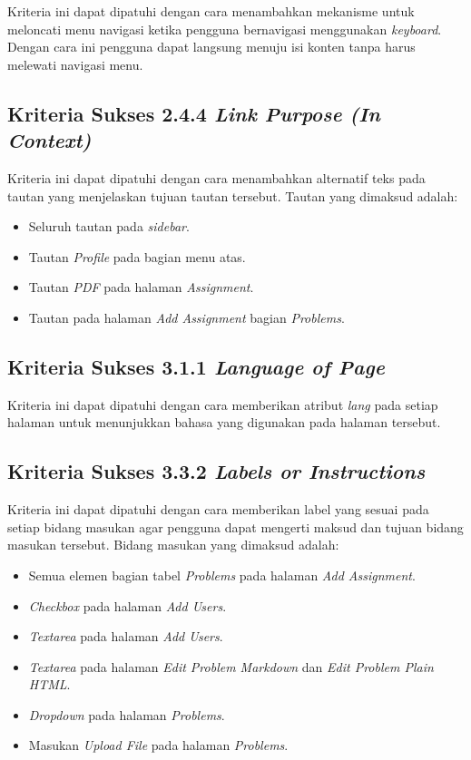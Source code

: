 Kriteria ini dapat dipatuhi dengan cara menambahkan mekanisme untuk meloncati menu navigasi ketika pengguna bernavigasi menggunakan \textit{keyboard}. Dengan cara ini pengguna dapat langsung menuju isi konten tanpa harus melewati navigasi menu.

\subsection{Kriteria Sukses 2.4.4 \textit{Link Purpose (In Context)}}
\label{subsec:peningkatan_A_2.4.4}

Kriteria ini dapat dipatuhi dengan cara menambahkan alternatif teks pada tautan yang menjelaskan tujuan tautan tersebut. Tautan yang dimaksud adalah:

\begin{itemize}
	\item Seluruh tautan pada \textit{sidebar}.
	\item Tautan \textit{Profile} pada bagian menu atas.
	\item Tautan \textit{PDF} pada halaman \textit{Assignment}.
	\item Tautan pada halaman \textit{Add Assignment} bagian \textit{Problems}.
\end{itemize}

\subsection{Kriteria Sukses 3.1.1 \textit{Language of Page}}
\label{subsec:peningkatan_A_3.1.1}

Kriteria ini dapat dipatuhi dengan cara memberikan atribut \textit{lang} pada setiap halaman untuk menunjukkan bahasa yang digunakan pada halaman tersebut.

\subsection{Kriteria Sukses 3.3.2 \textit{Labels or Instructions}}
\label{subsec:peningkatan_A_3.3.2}

Kriteria ini dapat dipatuhi dengan cara memberikan label yang sesuai pada setiap bidang masukan agar pengguna dapat mengerti maksud dan tujuan bidang masukan tersebut. Bidang masukan yang dimaksud adalah:

\begin{itemize}
	\item Semua elemen bagian tabel \textit{Problems} pada halaman \textit{Add Assignment}.
	\item \textit{Checkbox} pada halaman \textit{Add Users}.
	\item \textit{Textarea} pada halaman \textit{Add Users}.
	\item \textit{Textarea} pada halaman \textit{Edit Problem Markdown} dan \textit{Edit Problem Plain HTML}.
	\item \textit{Dropdown} pada halaman \textit{Problems}.
	\item Masukan \textit{Upload File} pada halaman \textit{Problems}.
\end{itemize}

